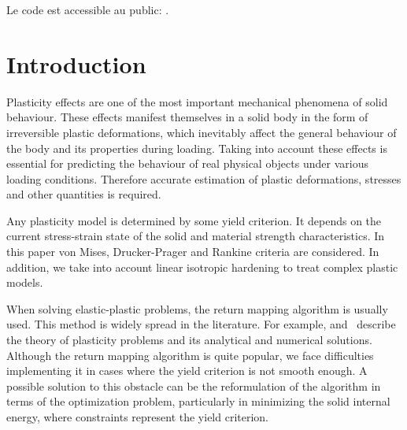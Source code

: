 \documentclass[12pt]{article}
\begin{document}
Le code est accessible au public: \parencite{convex-plasticity}.

\renewcommand{\contentsname}{\centering Table of contents}
\renewcommand{\listtablename}{\centering List of tables}
\renewcommand{\listfigurename}{\centering List of figures}

\newpage
\tableofcontents
\newpage
{}
{}
\listoftables
\newpage
{}
{}
\listoffigures

\newpage
{}
{}
\section*{Introduction}
Plasticity effects are one of the most important mechanical phenomena of solid behaviour. These effects manifest themselves in a solid body in the form of irreversible plastic deformations, which inevitably affect the general behaviour of the body and its properties during loading. Taking into account these effects is essential for predicting the behaviour of real physical objects under various loading conditions. Therefore accurate estimation of plastic deformations, stresses and other quantities is required.

Any plasticity model is determined by some yield criterion. It depends on the current stress-strain state of the solid and material strength characteristics. In this paper von Mises, Drucker-Prager and Rankine criteria are considered. In addition, we take into account linear isotropic hardening to treat complex plastic models.

When solving elastic-plastic problems, the return mapping algorithm is usually used. This method is widely spread in the literature. For example, \textcite{bonnet:hal-01083772} and~\textcite{nonlinear_FEM2012} describe the theory of plasticity problems and its analytical and numerical solutions. Although the return mapping algorithm is quite popular, we face difficulties implementing it in cases where the yield criterion is not smooth enough. A possible solution to this obstacle can be the reformulation of the algorithm in terms of the optimization problem, particularly in minimizing the solid internal energy, where constraints represent the yield criterion.
\end{document}
